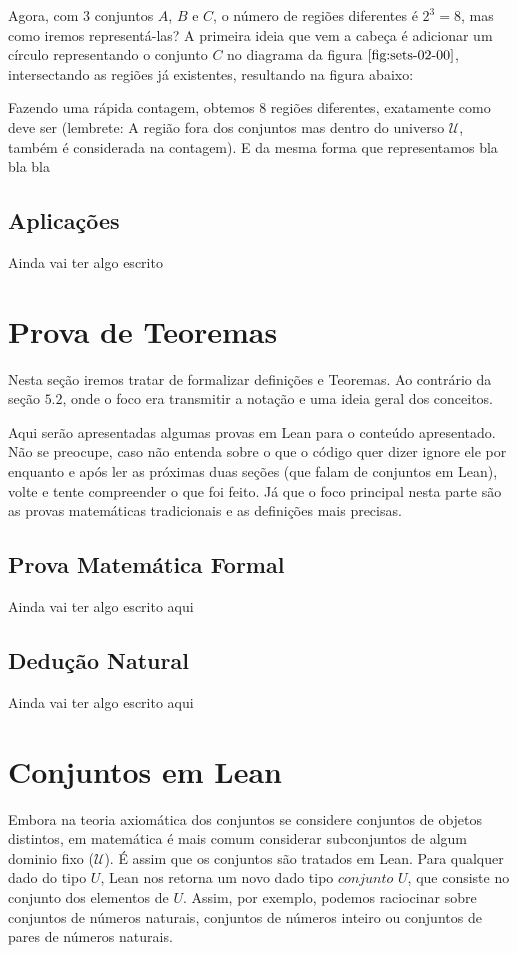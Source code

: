   Agora, com $3$ conjuntos $A$, $B$ e $C$, o número de regiões diferentes é $2^3=8$, mas como iremos representá-las? A primeira ideia que vem a cabeça é adicionar um círculo representando o conjunto $C$ no diagrama da figura $\ref{fig:sets-02-00}$, intersectando as regiões já existentes, resultando na figura abaixo:

  Fazendo uma rápida contagem, obtemos $8$ regiões diferentes, exatamente como deve ser (lembrete: A região fora dos conjuntos mas dentro do universo $\mathcal U$, também é considerada na contagem). E da mesma forma que representamos bla bla bla

  \subsection{Aplicações}
  Ainda vai ter algo escrito

\section{Prova de Teoremas}
Nesta seção iremos tratar de formalizar definições e Teoremas. Ao contrário da seção $5.2$, onde o foco era transmitir a notação e uma ideia geral dos conceitos.

Aqui serão apresentadas algumas provas em Lean para o conteúdo apresentado. Não se preocupe, caso não entenda sobre o que o código quer dizer ignore ele por enquanto e após ler as próximas duas seções (que falam de conjuntos em Lean), volte e tente compreender o que foi feito. Já que o foco principal nesta parte são as provas matemáticas tradicionais e as definições mais precisas.

  \subsection{Prova Matemática Formal}
  Ainda vai ter algo escrito aqui

  \subsection{Dedução Natural}
  Ainda vai ter algo escrito aqui

\section{Conjuntos em Lean}
Embora na teoria axiomática dos conjuntos se considere conjuntos de objetos distintos, em matemática é mais comum considerar subconjuntos de algum dominio fixo ($\mathcal U $). É assim que os conjuntos são tratados em Lean. Para qualquer dado do tipo $U$, Lean nos retorna um novo dado tipo $conjunto$ $U$, que consiste no conjunto dos elementos de $U$. Assim, por exemplo, podemos raciocinar sobre conjuntos de números naturais, conjuntos de números inteiro ou conjuntos de pares de números naturais.

